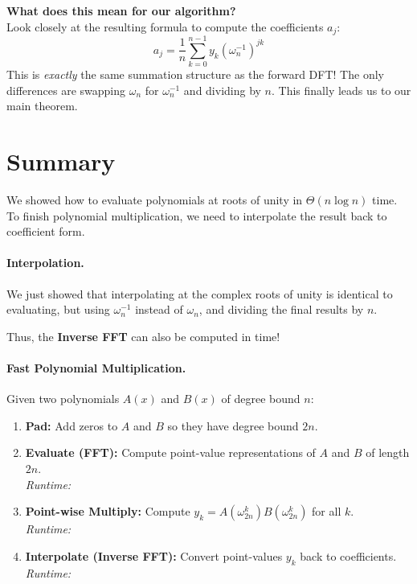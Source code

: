 \documentclass[11  pt]{article}
\begin{document}
\vs{1cm}

\textbf{What does this mean for our algorithm?} \\
Look closely at the resulting formula to compute the coefficients $a_j$:
\begin{equation*}
    a_j = \frac{1}{n} \sum_{k=0}^{n-1} y_k (\omega_n^{-1})^{jk}
\end{equation*}
This is \emph{exactly} the same summation structure as the forward DFT! The only differences are swapping $\omega_n$ for $\omega_n^{-1}$ and dividing by $n$. This finally leads us to our main theorem.

\newpage

\section{Summary}

We showed how to evaluate polynomials at roots of unity in $\Theta(n \log n)$ time. To finish polynomial multiplication, we need to interpolate the result back to coefficient form.

\paragraph{Interpolation.} 
We just showed that interpolating at the complex roots of unity is identical to evaluating, but using $\omega_n^{-1}$ instead of $\omega_n$, and dividing the final results by $n$. 

Thus, the \textbf{Inverse FFT} can also be computed in  time!

\vs{1.5cm}

\paragraph{Fast Polynomial Multiplication.}

Given two polynomials $A(x)$ and $B(x)$ of degree bound $n$:
\begin{enumerate}
    \setlength\itemsep{2em}
    \item \textbf{Pad:} Add zeros to $A$ and $B$ so they have degree bound $2n$.
    \item \textbf{Evaluate (FFT):} Compute point-value representations of $A$ and $B$ of length $2n$. \\ \textit{Runtime: }
    \item \textbf{Point-wise Multiply:} Compute $y_k = A(\omega_{2n}^k) B(\omega_{2n}^k)$ for all $k$. \\ \textit{Runtime: }
    \item \textbf{Interpolate (Inverse FFT):} Convert point-values $y_k$ back to coefficients. \\ \textit{Runtime: }
\end{enumerate}
\end{document}
